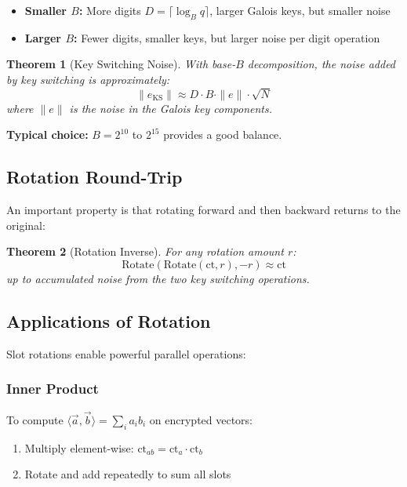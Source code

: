 \documentclass[11pt,a4paper]{article}
\newtheorem{theorem}{Theorem}
\begin{document}
\begin{itemize}
    \item \textbf{Smaller $B$:} More digits $D = \lceil \log_B q \rceil$, larger Galois keys, but smaller noise
    \item \textbf{Larger $B$:} Fewer digits, smaller keys, but larger noise per digit operation
\end{itemize}

\begin{theorem}[Key Switching Noise]
With base-$B$ decomposition, the noise added by key switching is approximately:
\[
\|e_{\text{KS}}\| \approx D \cdot B \cdot \|e\| \cdot \sqrt{N}
\]
where $\|e\|$ is the noise in the Galois key components.
\end{theorem}

\textbf{Typical choice:} $B = 2^{10}$ to $2^{15}$ provides a good balance.

\subsection{Rotation Round-Trip}

An important property is that rotating forward and then backward returns to the original:

\begin{theorem}[Rotation Inverse]
For any rotation amount $r$:
\[
\text{Rotate}(\text{Rotate}(\text{ct}, r), -r) \approx \text{ct}
\]
up to accumulated noise from the two key switching operations.
\end{theorem}

\subsection{Applications of Rotation}

Slot rotations enable powerful parallel operations:

\subsubsection{Inner Product}
To compute $\langle \vec{a}, \vec{b} \rangle = \sum_{i} a_i b_i$ on encrypted vectors:
\begin{enumerate}
    \item Multiply element-wise: $\text{ct}_{ab} = \text{ct}_a \cdot \text{ct}_b$
    \item Rotate and add repeatedly to sum all slots
\end{enumerate}
\end{document}
